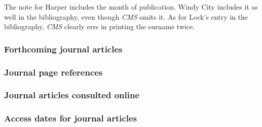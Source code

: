 \documentclass[11pt,letterpaper,oneside]{article}
\begin{document}
The note for Harper includes the month of publication. Windy City
includes it as well in the bibliography, even though \textit{CMS}
omits it. As for Lock's entry in the bibliography, \textit{CMS}
clearly errs in printing the surname twice.

\begin{citebib}
\item \cite[155]{lock2015}
\item \cite[651]{wesoky2015}
\item \cite[645]{harper2014}
\item \cite[60]{wilder2013}
\item \cite[52]{beattie1974}
\end{citebib}

\subsubsection{Forthcoming journal articles}

\begin{citebib}
\item \cite{authora}
\end{citebib}

\setcounter{subsubsection}{173}
\subsubsection{Journal page references}

\begin{citebib}
\item \cite{gold2015}
\item \cite[2--3]{paudyal2015}
\end{citebib}

\subsubsection{Journal articles consulted online}

\begin{citebib}
\item \cite[268]{whitney1929}
\item \cite[260--61]{schoenfield2016}
\end{citebib}

\subsubsection{Access dates for journal articles}
\end{document}
